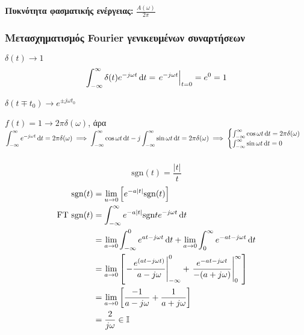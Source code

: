 \documentclass[11pt,a4paper,titlepage,fleqn]{article}
\begin{document}
     \begin{defn*}{}
     	\textbf{Πυκνότητα φασματικής ενέργειας:}
     	\(\displaystyle
     	\frac{A(\omega)}{2\pi}
     	\)
     \end{defn*}
     
     \subsubsection{Μετασχηματισμός Fourier γενικευμένων συναρτήσεων}
     \begin{enumgreekpar}
     	\item\( \delta(t) \to 1 \)
     	\[
     	\int_{-\infty}^{\infty} \delta(t)e^{-j\omega t}\dif t=
     	\left.e^{-j\omega t}\right|_{t=0}=e^0=1
     	\]
     	
     	\( \delta(t\mp t_0) \to e^{\pm j\omega t_0} \)
     	
     	\( f(t) =1\to 2\pi\delta(\omega ) \), άρα
     	\( \displaystyle \int_{-\infty}^{\infty}e^{-j\omega t }\dif t
     	=2\pi\delta(\omega ) \implies \int_{-\infty}^{\infty} \cos\omega t \dif t
     	-j\int_{-\infty}^{\infty}\sin\omega t\dif t = 2\pi\delta(\omega )\implies
     	\begin{cases}
     	\int_{-\infty}^{\infty} \cos\omega t\dif t = 2\pi\delta(\omega ) \\
     	\int_{-\infty}^{\infty} \sin\omega t\dif t = 0
     	\end{cases}
     	 \)
     \end{enumgreekpar}
     
     \subsubsection{}
     \[
     \mathrm{sgn}(t) = \frac{|t|}{t}
     \]
     \begin{align*}
     \mathrm{sgn}(t)&=\lim_{u\to0}\left[
     e^{-a|t|}\mathrm{sgn}(t)
     \right] \\
     \mathrm{ FT }\ \mathrm{sgn}(t) &=
     \int_{-\infty}^{\infty} e^{-a|t|}\mathrm{sgn}te^{-j\omega t}\dif t
     \\ &= \lim_{a\to0}\int_{-\infty}^{0} e^{at-j\omega t}\dif t
     + \lim_{a\to 0} \int_0^\infty e^{-at-j\omega t}\dif t
     \\ &=
     \lim_{a\to0}\left[ \left.-\frac{e^{(at-j\omega t)}}{a-j\omega }
     \right|_{-\infty}^0 + \left. \frac{e^{-at-j\omega t}}{-(a+j\omega )}
     \right|_0^\infty
      \right]
     \\ &= \lim_{a\to 0} \left[ \frac{-1}{a-j\omega }+\frac{1}{a+j\omega} \right]
     \\ &= \frac{2}{j\omega }\in\mathbb I
     \end{align*}
     
\end{document}
